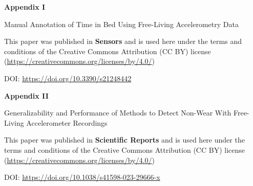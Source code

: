 \documentclass[
  10pt,
]{scrbook}
\let\originaltextbf\textbf
\renewcommand{\textbf}[1]{\textcolor{color1}{\textsf{\originaltextbf{#1}}}}
\begin{document}
\begin{center}

\textbf{\textsf{\Huge Appendix I}}



\vspace{2cm}

\textsf{\Huge Manual Annotation of Time in Bed Using Free-Living Accelerometry Data}

\vspace{5cm}

This paper was published in \textbf{Sensors} and is used here under the terms and conditions of the Creative Commons Attribution (CC BY) license (\href{https://creativecommons.org/licenses/by/4.0/}{https://creativecommons.org/licenses/by/4.0/})

\vspace{1cm}

DOI: \href{https://doi.org/10.3390/s21248442}{https://doi.org/10.3390/s21248442}

\end{center}



\begin{center}

\textbf{\textsf{\Huge Appendix II}}



\vspace{2cm}

\textsf{\Huge Generalizability and Performance of Methods to Detect Non-Wear With Free-Living Accelerometer Recordings}

\vspace{5cm}

This paper was published in \textbf{Scientific Reports} and is used here under the terms and conditions of the Creative Commons Attribution (CC BY) license (\href{https://creativecommons.org/licenses/by/4.0/}{https://creativecommons.org/licenses/by/4.0/})

\vspace{1cm}

DOI: \href{https://doi.org/10.1038/s41598-023-29666-x}{https://doi.org/10.1038/s41598-023-29666-x}

\end{center}
\end{document}
